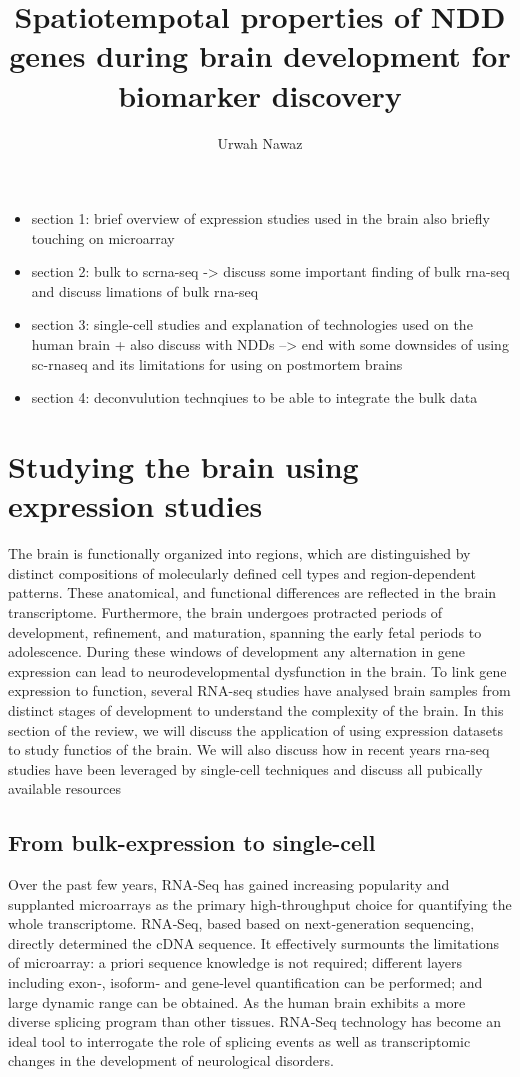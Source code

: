 \documentclass[12pt]{article}
\title{Spatiotempotal properties of NDD genes during brain development for biomarker discovery}
\author{Urwah Nawaz}
\begin{document}
	\maketitle


\begin{itemize}
	\item section 1: brief overview of expression studies used in the brain also briefly touching on microarray 
	\item section 2: bulk to scrna-seq -> discuss some important finding of bulk rna-seq and discuss limations of bulk rna-seq
	\item section 3: single-cell studies and explanation of technologies used on the human brain + also discuss with NDDs --> end with some downsides of using sc-rnaseq and its limitations for using on postmortem brains
	\item section 4: deconvulution technqiues to be able to integrate the bulk data 

\end{itemize}
\section{Studying the brain using expression studies}
The brain is functionally organized into regions, which are distinguished by distinct compositions of molecularly defined cell types and region-dependent patterns. These anatomical, and functional differences are reflected in the brain transcriptome. 
Furthermore, the brain undergoes protracted periods of development, refinement, and maturation, spanning the early fetal periods to adolescence.
During these windows of development any alternation in gene expression can lead to neurodevelopmental dysfunction in the brain. 
To link gene expression to function, several RNA-seq studies have analysed brain samples from distinct stages of development to understand the complexity of the brain. In this section of the review, we will discuss the application of using expression datasets to study functios of the brain. 
We will also discuss how in recent years rna-seq studies have been leveraged by single-cell techniques and discuss all pubically available resources

\subsection{From bulk-expression to single-cell}
Over the past few years, RNA‐Seq has gained increasing popularity and supplanted microarrays as the primary high‐throughput choice for quantifying the whole transcriptome.
RNA‐Seq, based based on next‐generation sequencing, directly determined the cDNA sequence. It effectively surmounts the limitations of microarray: a priori sequence knowledge is not required; different layers including exon‐, isoform‐ and gene‐level quantification can be performed; and large dynamic range can be obtained. As the human brain exhibits a more diverse splicing program than other tissues.  RNA‐Seq technology has become an ideal tool to interrogate the role of splicing events as well as transcriptomic changes in the development of neurological disorders.
\end{document}
